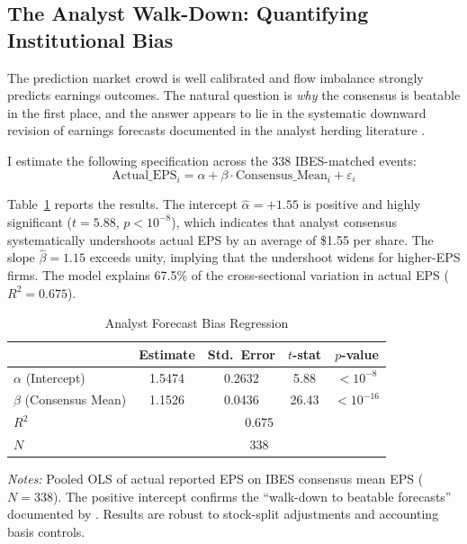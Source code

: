 \documentclass[11pt]{article}
\begin{document}
\subsection{The Analyst Walk-Down: Quantifying Institutional Bias}

The prediction market crowd is well calibrated and flow imbalance strongly predicts earnings outcomes. The natural question is \textit{why} the consensus is beatable in the first place, and the answer appears to lie in the systematic downward revision of earnings forecasts documented in the analyst herding literature \citep{richardson2004walk, hong2000security}.

I estimate the following specification across the 338 IBES-matched events:
\begin{equation}
\text{Actual\_EPS}_i = \alpha + \beta \cdot \text{Consensus\_Mean}_i + \varepsilon_i
\end{equation}

Table~\ref{tab:bias_reg} reports the results. The intercept $\hat{\alpha} = +1.55$ is positive and highly significant ($t = 5.88$, $p < 10^{-8}$), which indicates that analyst consensus systematically undershoots actual EPS by an average of \$1.55 per share. The slope $\hat{\beta} = 1.15$ exceeds unity, implying that the undershoot widens for higher-EPS firms. The model explains 67.5\% of the cross-sectional variation in actual EPS ($R^2 = 0.675$).

\begin{table}[htbp]
\centering
\begin{threeparttable}
\caption{Analyst Forecast Bias Regression}
\label{tab:bias_reg}
\begin{tabular}{lcccc}
\toprule
& Estimate & Std.\ Error & $t$-stat & $p$-value \\
\midrule
$\alpha$ (Intercept) & 1.5474 & 0.2632 & 5.88 & $<10^{-8}$ \\
$\beta$ (Consensus Mean) & 1.1526 & 0.0436 & 26.43 & $<10^{-16}$ \\
\midrule
$R^2$ & \multicolumn{4}{c}{0.675} \\
$N$ & \multicolumn{4}{c}{338} \\
\bottomrule
\end{tabular}
\begin{tablenotes}
\small
\item \textit{Notes:} Pooled OLS of actual reported EPS on IBES consensus mean EPS ($N = 338$). The positive intercept confirms the ``walk-down to beatable forecasts'' documented by \citet{richardson2004walk}. Results are robust to stock-split adjustments and accounting basis controls.
\end{tablenotes}
\end{threeparttable}
\end{table}
\end{document}
